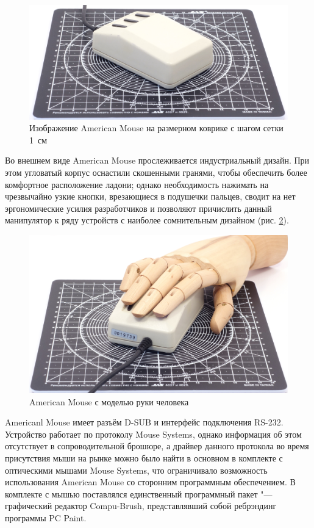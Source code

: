 \documentclass[11pt, a4paper]{article}
\begin{document}
\begin{figure}[h]
    \centering
    \includegraphics[scale=0.5]{1986_american_mouse/size_30.jpg}
    \caption{Изображение American Mouse на размерном коврике с шагом сетки 1~см}
    \label{fig:AmericanSize}
\end{figure}

Во внешнем виде American Mouse прослеживается индустриальный дизайн. При этом угловатый корпус оснастили скошенными гранями, чтобы обеспечить более комфортное расположение ладони; однако необходимость нажимать на чрезвычайно узкие кнопки, врезающиеся в подушечки пальцев, сводит на нет эргономические усилия разработчиков и позволяют причислить данный манипулятор к ряду устройств с наиболее сомнительным дизайном (рис. \ref{fig:AmericanHand}).

\begin{figure}[h]
    \centering
    \includegraphics[scale=0.5]{1986_american_mouse/hand_30.jpg}
    \caption{American Mouse с моделью руки человека}
    \label{fig:AmericanHand}
\end{figure}

Americanl Mouse имеет разъём D-SUB и интерфейс подключения RS-232. Устройство работает по протоколу Mouse Systems, однако информация об этом отсутствует в сопроводительной брошюре, а драйвер данного протокола во время присутствия мыши на рынке можно было найти в основном в комплекте с оптическими мышами Mouse Systems, что ограничивало возможность использования American Mouse со сторонним программным обеспечением. В комплекте с мышью поставлялся единственный программный пакет "--- графический редактор Compu-Brush, представлявший собой ребрэндинг программы PC Paint.
\end{document}
